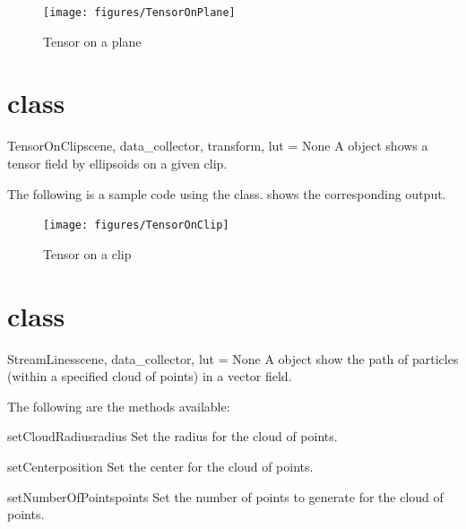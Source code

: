 \begin{figure}[ht]
\begin{center}
\texttt{[image: figures/TensorOnPlane]}
\end{center}
\caption{Tensor on a plane}
\label{fig:tensoronplane.1}
\end{figure}

\section{\TensorOnClip class}
\begin{classdesc}{TensorOnClip}{scene, data_collector, transform, lut = None}
A \TensorOnClip object shows a tensor field by ellipsoids on a given clip.
\end{classdesc}

The following is a sample code using the \TensorOnClip class.
 shows the corresponding output.


\begin{figure}[ht]
\begin{center}
\texttt{[image: figures/TensorOnClip]}
\end{center}
\caption{Tensor on a clip}
\label{fig:tensoronclip.1}
\end{figure}

\section{\StreamLines class}
\begin{classdesc}{StreamLines}{scene, data_collector, lut = None}
A \StreamLines object show the path of particles (within a specified cloud 
of points) in a vector field.
\end{classdesc}

The following are the methods available:
\begin{methoddesc}[StreamLines]{setCloudRadius}{radius}
Set the radius for the cloud of points.
\end{methoddesc}

\begin{methoddesc}[StreamLines]{setCenter}{position}
Set the center for the cloud of points.
\end{methoddesc}

\begin{methoddesc}[StreamLines]{setNumberOfPoints}{points}
Set the number of points to generate for the cloud of points.
\end{methoddesc}

